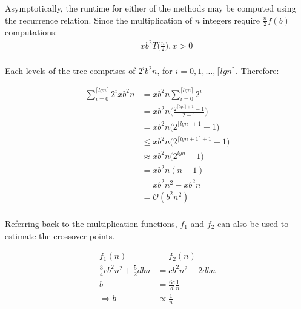 \documentclass[usletter, 12pt]{article}
\begin{document}
        Asymptotically, the runtime for either of the methods may be computed using the recurrence relation. Since the multiplication of $n$ integers require $\frac{n}{2}f(b)$ computations:
        \begin{equation*}
            \begin{split}
                & = xb^2T \bigg(\frac{n}{2}\bigg), x > 0 \\
            \end{split}
        \end{equation*}

        Each levels of the tree comprises of $2^ib^2n$, for $i = 0, 1, \ldots, \lceil lgn\rceil$. Therefore:

        \begin{equation*}
            \begin{split}
                \sum_{i=0}^{\lceil lgn\rceil} 2^ixb^2n & = xb^2n\sum_{i=0}^{\lceil lgn\rceil} 2^i \\
                & = xb^2n \bigg(\frac{2^{\lceil lgn\rceil+1}-1}{2-1}\bigg) \\
                & = xb^2n \bigg(2^{\lceil lgn\rceil+1}-1\bigg) \\
                & \leq xb^2n \bigg(2^{\lceil lgn+1\rceil+1}-1\bigg) \\
                & \approx xb^2n \big(2^{lgn}-1\big) \\
                & = xb^2n (n-1) \\
                & = xb^2n^2 - xb^2n \\
                & = \mathcal{O}(b^2n^2) \\
            \end{split}
        \end{equation*}

        Referring back to the multiplication functions, $f_1$ and $f_2$ can also be used to estimate the crossover points.

        \begin{equation*}
            \begin{split}
                f_1(n) & = f_2(n) \\
                \frac{3}{4}cb^2n^2+\frac{5}{2}dbn & = cb^2n^2+2dbn \\
                b & = \frac{6c}{d}\frac{1}{n} \\
                \Rightarrow b & \propto \frac{1}{n}
            \end{split}
        \end{equation*}
\end{document}
